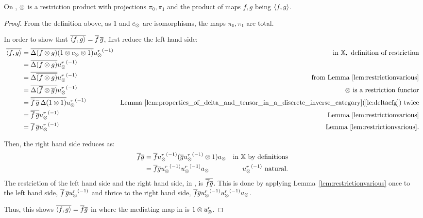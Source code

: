 \begin{lemma}\label{lem:tensor_on_x_is_the_restriction_product_on_xt}
  On \Xt, $\otimes$ is a restriction product with projections $\pi_0, \pi_1$ and the product of maps
  $f, g$ being $\langle f,g\rangle$.
\end{lemma}
\begin{proof}
  From the definition above, as $1$ and $c_{\otimes}$ are isomorphisms, the maps $\pi_0, \pi_1$ are
  total.

  In order to show that $\overline{\langle f,g\rangle} = \overline{f}\,\overline{g}$, first reduce the left hand side:
  \begin{align*}
    \overline{\langle f,g\rangle}
      &=\overline{\Delta(f\otimes g)(1\otimes c_{\otimes}\otimes1)}{u_{\otimes}^r}^{(-1)}&\text{in }\mathbb{X}, \text{ definition of restriction}\\
    &=\overline{\Delta(f\otimes g)}{u_{\otimes}^r}^{(-1)} &\\
    &=\overline{\Delta\overline{(f\otimes g)}}{u_{\otimes}^r}^{(-1)} &\text{from Lemma \ref{lem:restrictionvarious}}\\
    &=\overline{\Delta(\overline{f}\otimes\overline{g})}{u_{\otimes}^r}^{(-1)} &\otimes\text{ is a restriction functor}\\
    &=\overline{\overline{f}\,\overline{g}\,\Delta(1\otimes1)}{u_{\otimes}^r}^{(-1)}
      &\text{Lemma  \ref{lem:properties_of_delta_and_tensor_in_a_discrete_inverse_category}(\ref{le:deltaefg}) twice}\\
    &=\overline{\overline{f}\,\overline{g}}{u_{\otimes}^r}^{(-1)} &\text{Lemma  \ref{lem:restrictionvarious}}\\
    &=\overline{f}\,\overline{g}{u_{\otimes}^r}^{(-1)}  &\text{Lemma  \ref{lem:restrictionvarious}.}\\
  \end{align*}

  Then, the right hand side reduces as:
  \begin{align*}
    \rst{f} \rst{g}
    &= \rst{f}\inv{\usr}(\rst{g}\inv{\usr} \* 1) a_{\*} & \text{in \X by definitions}\\
    &= \rst{f} \rst{g}\inv{\usr}\inv{\usr} a_{\*} &  \inv{\usr}\text{ natural.}
  \end{align*}
  The restriction of the left hand side and the right hand side, in \X, is $\overline{\overline{f} \overline{g}}$.
  This is done by applying Lemma~\ref{lem:restrictionvarious} once to the left hand side,
  $\overline{f}\,\overline{g}{u_{\otimes}^r}^{(-1)}$ and thrice to the right hand side,
  $\overline{f} \overline{g}{u_{\otimes}^r}^{(-1)}{u_{\otimes}^r}^{(-1)} a_{\otimes}$.

  Thus, this shows $\overline{\langle f,g\rangle}=\overline{f} \overline{g}$ in \Xt where the mediating map in \X is
  $1\otimes u_{\otimes}^r$.


\end{proof}
